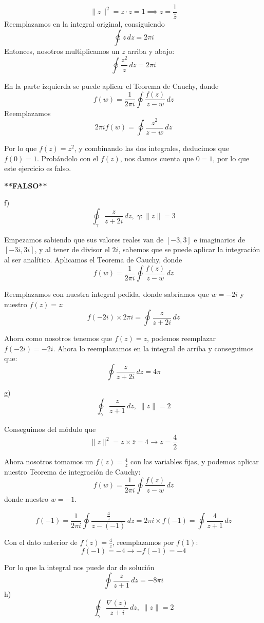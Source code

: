 \documentclass[a4paper,12pt]{article}
\begin{document}
\[
\|z\|^2 = z \cdot \overline{z} = 1 \implies z = \frac{1}{\overline{z}}
\]
Reemplazamos en la integral original, consiguiendo
\[
\oint z \, dz = 2\pi i
\]
Entonces, nosotros multiplicamos un $z$ arriba y abajo:
\[
\oint \frac{z^2}{z} \, dz = 2\pi i
\]

En la parte izquierda se puede aplicar el Teorema de Cauchy, donde
\[
f(w) = \frac{1}{2\pi i} \oint \frac{f(z)}{z - w} \, dz
\]
Reemplazamos
\[
2\pi i f(w) = \oint \frac{z^2}{z - w} \, dz
\]

Por lo que $f(z) = z^2$, y combinando las dos integrales, deducimos que $f(0) = 1$.  
Probándolo con el $f(z)$, nos damos cuenta que $0 = 1$, por lo que este ejercicio es falso.

\textbf{**FALSO**}

\medskip

f)  
\[
\oint_\gamma \frac{z}{z + 2i} \, dz, \; \gamma : \|z\| = 3
\]

Empezamos sabiendo que sus valores reales van de $[-3,3]$ e imaginarios de $[-3i,3i]$, y al tener de divisor el $2i$, sabemos que se puede aplicar la integración al ser analítico.  
Aplicamos el Teorema de Cauchy, donde
\[
f(w) = \frac{1}{2\pi i} \oint \frac{f(z)}{z - w} \, dz
\]

Reemplazamos con nuestra integral pedida, donde sabríamos que $w = -2i$ y nuestro $f(z) = z$:
\[
f(-2i) \times 2\pi i = \oint \frac{z}{z + 2i} \, dz
\]

Ahora como nosotros tenemos que $f(z) = z$, podemos reemplazar $f(-2i) = -2i$.  
Ahora lo reemplazamos en la integral de arriba y conseguimos que:
\[
\oint \frac{z}{z + 2i} \, dz = 4\pi
\]

\medskip

g)  
\[
\oint_\gamma \frac{z}{z + 1} \, dz, \; \|z\| = 2
\]

Conseguimos del módulo que
\[
\|z\|^2 = z \times \overline{z} = 4 \to z = \frac{4}{2}
\]

Ahora nosotros tomamos un $f(z) = \frac{4}{z}$ con las variables fijas, y podemos aplicar nuestro Teorema de integración de Cauchy:
\[
f(w) = \frac{1}{2\pi i} \oint \frac{f(z)}{z - w} \, dz
\]
donde nuestro $w = -1$.

\[
f(-1) = \frac{1}{2\pi i} \oint \frac{\frac{4}{z}}{z - (-1)} \, dz = 2\pi i \times f(-1) = \oint \frac{4}{z + 1} \, dz
\]

Con el dato anterior de $f(z) = \frac{4}{z}$, reemplazamos por $f(1)$:
\[
f(-1) = -4 \to -f(-1) = -4
\]

Por lo que la integral nos puede dar de solución
\[
\oint \frac{z}{z + 1} \, dz = -8\pi i
\]
h)  
\[
\oint_\gamma \frac{\nabla(z)}{z + i} \, dz, \; \|z\| = 2
\]
\end{document}
